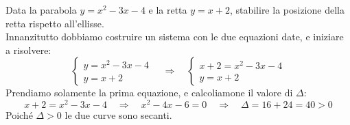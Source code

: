 \begin{esempio} Data la parabola $ y = x^2-3x-4$ e la retta $y=x+2$, stabilire la posizione della retta 
rispetto all'ellisse.
\\[7pt]
Innanzitutto dobbiamo costruire un sistema con le due equazioni date, e iniziare a risolvere:
\[\begin{cases} y =x^2-3x-4 \\ y=x+2\end{cases} \quad \Rightarrow \quad \begin{cases} x+2 =x^2-3x-4 \\ y=x+2\end{cases}\]
Prendiamo solamente la prima equazione, e calcoliamone il valore di $\Delta$:
\[x+2 =x^2-3x-4 \quad \Rightarrow \quad x^2-4x-6=0 \quad \Rightarrow \quad \Delta = 16+24=40>0\]
Poiché $\Delta>0$ le due curve sono secanti.
\end{esempio}


